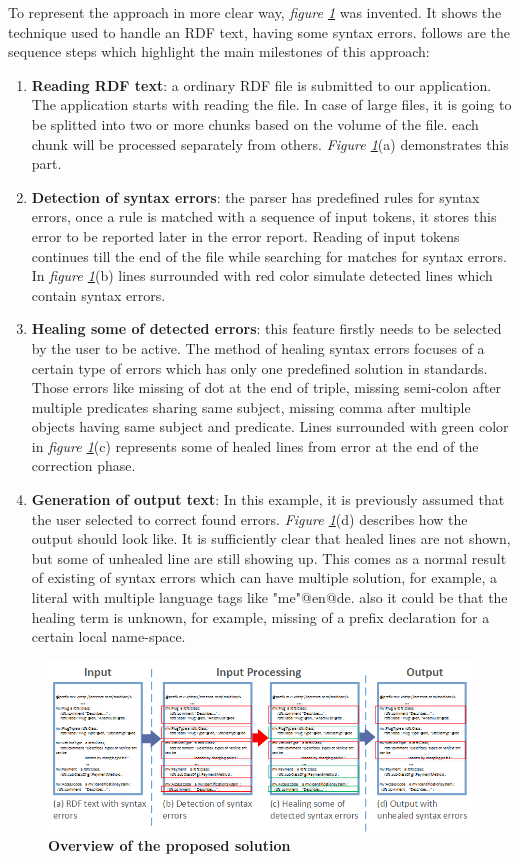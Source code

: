  To represent the approach in more clear way, {\it figure \ref{Fig:Approach}} was invented. It shows the technique used to handle an RDF text, having some syntax errors. follows are the sequence steps which highlight the main milestones of this approach:
 \begin{enumerate}[label=(\alph*)]
\item \textbf{Reading RDF text}: a ordinary RDF file is submitted to our application. The application starts with reading the file. In case of large files, it is going to be splitted into two or more chunks based on the volume of the file. each chunk will be processed separately from others.  {\it Figure \ref{Fig:Approach}}(a) demonstrates this part. 
\item \textbf{Detection of syntax errors}: the parser has predefined rules for syntax errors, once a rule is matched with a sequence of input tokens, it stores this error to be reported later in the error report. Reading of input tokens continues till the end of the file while searching for matches for syntax errors. In  {\it figure \ref{Fig:Approach}}(b) lines surrounded with red color simulate detected lines which contain syntax errors. 
\item \textbf {Healing some of detected errors}: this feature firstly needs to be selected by the user to be active. The method of healing syntax errors focuses of a certain type of errors which has only one predefined solution in standards. Those errors like missing of dot at the end of triple, missing semi-colon after multiple predicates sharing same subject, missing comma after multiple objects having same subject and predicate. Lines surrounded with green color in {\it figure \ref{Fig:Approach}}(c) represents some of healed lines from error at the end of the correction phase.  
\item\textbf {Generation of output text}: In this example, it is previously assumed that the user selected to correct found errors.  {\it Figure \ref{Fig:Approach}}(d) describes how the output should look like. It is sufficiently clear that healed lines are not shown, but some of unhealed line are still showing up. This comes as a normal result of existing of syntax errors which can have multiple solution, for example, a literal with multiple language tags like "me"@en@de. also it could be that the healing term is unknown, for example, missing of a prefix declaration for a certain local name-space. 
\end{enumerate} 

\begin{figure}
	\centering
	  	\includegraphics[width=1\textwidth]{images/Approach.png}
		\caption{\textbf{Overview of the proposed solution}}
		\label{Fig:Approach}  
\end{figure}
